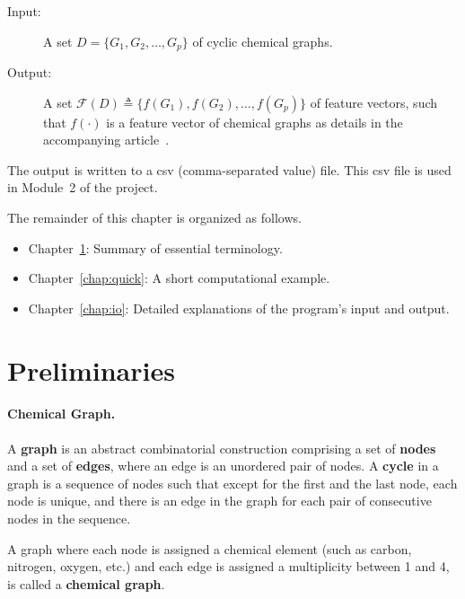 \documentclass[11pt,titlepage,dvipdfmx,twoside]{book}
\newcommand{\chapref}[1]{Chapter~\ref{chap:#1}}
\begin{document}
\begin{oframed}
\begin{description}
\item[Input:] 
A set $D=\{G_1, G_2, \dots, G_p\}$ of cyclic chemical graphs. 
%
\item[Output:] 
A set ${\mathcal F}(D)\triangleq\{f(G_1), f(G_2), \dots, f(G_p)\}$
of feature vectors, such that $f(\cdot)$ is a feature vector of
chemical graphs as details in the accompanying article~\cite{AN20}.
%
\end{description}
\end{oframed}
%
The output is written to a csv (comma-separated value) file.
This csv file is used in Module~2 of the project.


The remainder of this chapter is organized as follows. 
\begin{itemize}
\item \chapref{preparation}: 
Summary of essential terminology. %

\item \chapref{quick}: 
A short computational example.

\item \chapref{io}: 
Detailed explanations of the program's input and output.
\end{itemize}

\section{Preliminaries}
\label{chap:preparation}

\paragraph{Chemical Graph.}
A {\bf graph} is an abstract combinatorial construction
comprising a set of {\bf nodes} and a set of {\bf edges},
where an edge is an unordered pair of nodes.
A {\bf cycle} in a graph is a sequence of
nodes such that except for the first and the last node,
each node is unique, and there is an edge in the graph 
for each pair of consecutive 
nodes in the sequence.

A graph where each node is assigned a chemical element
(such as carbon, nitrogen, oxygen, etc.) and each
edge is assigned a multiplicity between 1 and 4,
is called a {\bf chemical graph}.
\end{document}
